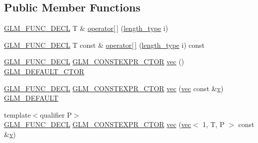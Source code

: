 \subsection*{Public Member Functions}
\begin{DoxyCompactItemize}
\item 
\mbox{\hyperlink{setup_8hpp_ab2d052de21a70539923e9bcbf6e83a51}{G\+L\+M\+\_\+\+F\+U\+N\+C\+\_\+\+D\+E\+CL}} T \& \mbox{\hyperlink{structglm_1_1vec_3_011_00_01_t_00_01_q_01_4_a3ddc7f24ef7c4820534a14043fb51946}{operator\mbox{[}$\,$\mbox{]}}} (\mbox{\hyperlink{structglm_1_1vec_3_011_00_01_t_00_01_q_01_4_a37415eee3b59cf93cdb752a2b30fe5e6}{length\+\_\+type}} i)
\item 
\mbox{\hyperlink{setup_8hpp_ab2d052de21a70539923e9bcbf6e83a51}{G\+L\+M\+\_\+\+F\+U\+N\+C\+\_\+\+D\+E\+CL}} T const  \& \mbox{\hyperlink{structglm_1_1vec_3_011_00_01_t_00_01_q_01_4_aca63447e88983b17ea1cb8698f9f8018}{operator\mbox{[}$\,$\mbox{]}}} (\mbox{\hyperlink{structglm_1_1vec_3_011_00_01_t_00_01_q_01_4_a37415eee3b59cf93cdb752a2b30fe5e6}{length\+\_\+type}} i) const
\item 
\mbox{\hyperlink{setup_8hpp_ab2d052de21a70539923e9bcbf6e83a51}{G\+L\+M\+\_\+\+F\+U\+N\+C\+\_\+\+D\+E\+CL}} \mbox{\hyperlink{setup_8hpp_ad34178a09666081abdb573c14d1f4a5a}{G\+L\+M\+\_\+\+C\+O\+N\+S\+T\+E\+X\+P\+R\+\_\+\+C\+T\+OR}} \mbox{\hyperlink{structglm_1_1vec_3_011_00_01_t_00_01_q_01_4_a4fda39784b2ba699a88c6a4c2b94fc7b}{vec}} () \mbox{\hyperlink{setup_8hpp_afb97a4e995bc004c0cbbfa22125b80ba}{G\+L\+M\+\_\+\+D\+E\+F\+A\+U\+L\+T\+\_\+\+C\+T\+OR}}
\item 
\mbox{\hyperlink{setup_8hpp_ab2d052de21a70539923e9bcbf6e83a51}{G\+L\+M\+\_\+\+F\+U\+N\+C\+\_\+\+D\+E\+CL}} \mbox{\hyperlink{setup_8hpp_ad34178a09666081abdb573c14d1f4a5a}{G\+L\+M\+\_\+\+C\+O\+N\+S\+T\+E\+X\+P\+R\+\_\+\+C\+T\+OR}} \mbox{\hyperlink{structglm_1_1vec_3_011_00_01_t_00_01_q_01_4_ac61412a4328fca49ded68a788eee5385}{vec}} (\mbox{\hyperlink{structglm_1_1vec}{vec}} const \&\mbox{\hyperlink{_s_d_l__opengl_8h_a10a82eabcb59d2fcd74acee063775f90}{v}}) \mbox{\hyperlink{setup_8hpp_aefce7051c376a64ba89fa93a9f63bc2c}{G\+L\+M\+\_\+\+D\+E\+F\+A\+U\+LT}}
\item 
{\footnotesize template$<$qualifier P$>$ }\\\mbox{\hyperlink{setup_8hpp_ab2d052de21a70539923e9bcbf6e83a51}{G\+L\+M\+\_\+\+F\+U\+N\+C\+\_\+\+D\+E\+CL}} \mbox{\hyperlink{setup_8hpp_ad34178a09666081abdb573c14d1f4a5a}{G\+L\+M\+\_\+\+C\+O\+N\+S\+T\+E\+X\+P\+R\+\_\+\+C\+T\+OR}} \mbox{\hyperlink{structglm_1_1vec_3_011_00_01_t_00_01_q_01_4_a335f0b237f2efd588837a62b9a8e7306}{vec}} (\mbox{\hyperlink{structglm_1_1vec}{vec}}$<$ 1, T, P $>$ const \&\mbox{\hyperlink{_s_d_l__opengl_8h_a10a82eabcb59d2fcd74acee063775f90}{v}})

\end{DoxyCompactItemize}

